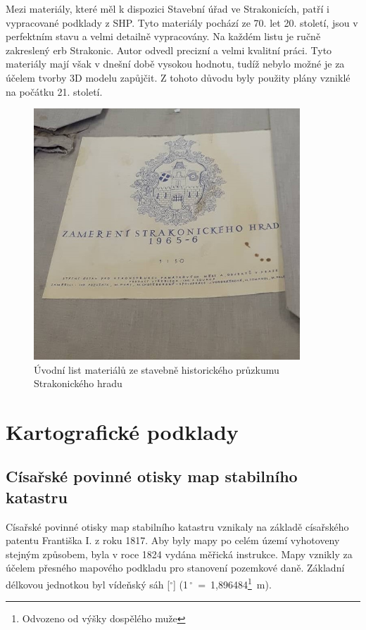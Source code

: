 \documentclass[thesis=M,czech]{FITthesis}[2012/06/26]
\begin{document}
Mezi materiály, které měl k dispozici Stavební úřad ve Strakonicích, patří i vypracované podklady z SHP. Tyto materiály pochází ze 70. let 20. století, jsou v perfektním stavu a velmi detailně vypracovány. Na každém listu je ručně zakreslený erb Strakonic. Autor odvedl precizní a velmi kvalitní práci. Tyto materiály mají však v dnešní době vysokou hodnotu, tudíž nebylo možné je za účelem tvorby 3D modelu zapůjčit. Z tohoto důvodu byly použity plány vzniklé na počátku 21. století. \cite{shp}

\clearpage

\begin{figure}[h!]
	\centering
	\includegraphics[width=10cm]{pics/shp.jpg}
	\caption{Úvodní list materiálů ze stavebně historického průzkumu Strakonického hradu}
	\label{obrazek:shp}
\end{figure}


\section{Kartografické podklady}
\subsection{Císařské povinné otisky map stabilního katastru}
Císařské povinné otisky map stabilního katastru vznikaly na základě císařského patentu Františka I. z roku 1817. Aby byly mapy po celém území vyhotoveny stejným způsobem, byla v roce 1824 vydána měřická instrukce. Mapy vznikly za účelem přesného mapového podkladu pro stanovení pozemkové daně. Základní délkovou jednotkou byl vídeňský sáh [$^\circ$] (1\,$^\circ$~=~1,896484\footnote{Odvozeno od výšky dospělého muže}~m).
\end{document}
